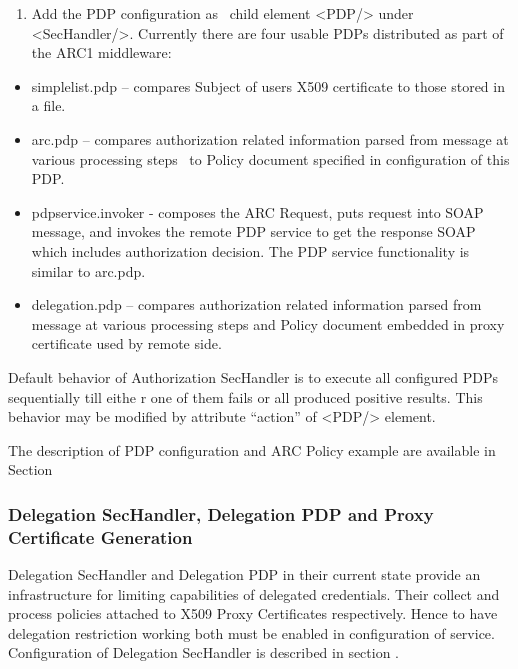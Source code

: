 \documentclass{article}
\newcounter{saveenum}
\newcommand\liststyleWWviiiNumxi{%
\renewcommand\theenumi{\arabic{enumi}}
\renewcommand\theenumii{\arabic{enumii}}
\renewcommand\theenumiii{\arabic{enumiii}}
\renewcommand\theenumiv{\arabic{enumiv}}
\renewcommand\labelenumi{\theenumi.}
\renewcommand\labelenumii{\theenumii.}
\renewcommand\labelenumiii{\theenumiii.}
\renewcommand\labelenumiv{\theenumiv.}
}
\newcommand\liststyleWWviiiNumxii{%
\renewcommand\labelitemi{[F0B7?]}
\renewcommand\labelitemii{[F0B7?]}
\renewcommand\labelitemiii{[F0B7?]}
\renewcommand\labelitemiv{[F0B7?]}
}
\begin{document}
\liststyleWWviiiNumxi
\setcounter{saveenum}{\value{enumi}}
\begin{enumerate}
\setcounter{enumi}{\value{saveenum}}
\item {\color{black}
Add the PDP configuration as \ child element
{\textless}PDP/{\textgreater} under
{\textless}SecHandler/{\textgreater}. Currently there are four usable
PDPs distributed as part of the ARC1 middleware:}
\end{enumerate}
\liststyleWWviiiNumxii
\begin{itemize}
\item {\color{black}
simplelist.pdp -- compares Subject of user{\textquotesingle}s X509
certificate to those stored in a file.}
\item {\color{black}
arc.pdp -- compares authorization related information parsed from
message at various processing steps \ to Policy document specified in
configuration of this PDP.}
\item {\color{black}
pdpservice.invoker - composes the ARC Request, puts request into SOAP
message, and invokes the remote PDP service to get the response SOAP
which includes authorization decision. The PDP service functionality is
similar to arc.pdp.}
\item {\color{black}
delegation.pdp -- compares authorization related information parsed from
message at various processing steps and Policy document embedded in
proxy certificate used by remote side.}
\end{itemize}
{\color{black}
Default behavior of Authorization SecHandler is to execute all
configured PDPs sequentially till eithe r one of them fails or all
produced positive results. This behavior may be modified by attribute
{\textquotedblleft}action{\textquotedblright} of
{\textless}PDP/{\textgreater} element.}

{\upshape\color{black}
The description of PDP configuration and ARC Policy example are
available in Section }

\subsubsection[Delegation SecHandler, Delegation PDP and Proxy
Certificate Generation]{Delegation SecHandler, Delegation PDP and Proxy
Certificate Generation}
{\upshape\color{black}
Delegation SecHandler and Delegation PDP in their current state provide
an infrastructure for limiting capabilities of delegated credentials.
Their collect and process policies attached to X509 Proxy Certificates
respectively. Hence to have delegation restriction working both must be
enabled in configuration of service. Configuration of Delegation
SecHandler is described in section . }
\end{document}
